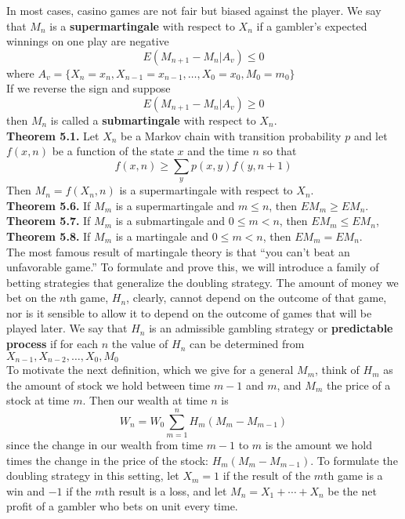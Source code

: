 \documentclass[12pt]{article}
\begin{document}
In most cases, casino games are not fair but biased against the player. We say that $M_n$ is a \textbf{supermartingale} with respect to $X_n$ if a gambler's expected winnings on one play are negative $$E(M_{n+1} - M_n | A_v) \leq 0$$ where $A_v = \{ X_n = x_n, X_{n-1} = x_{n-1}, \ldots, X_0 = x_0, M_0 = m_0\}$\\

If we reverse the sign and suppose $$E(M_{n+1} - M_n | A_v) \geq 0$$ then $M_n$ is called a \textbf{submartingale} with respect to $X_n$.\\

\textbf{Theorem 5.1.} Let $X_n$ be a Markov chain with transition probability $p$ and let $f(x,n)$ be a function of the state $x$ and the time $n$ so that $$f(x,n) \geq \sum_y p(x,y)f(y, n+1)$$ Then $M_n = f(X_n, n)$ is a supermartingale with respect to $X_n$.\\

\textbf{Theorem 5.6.} If $M_m$ is a supermartingale and $m \leq n$, then $EM_m \geq EM_n$.\\

\textbf{Theorem 5.7.} If $M_m$ is a submartingale and $0 \leq m <n$, then $EM_m \leq EM_n$,\\

\textbf{Theorem 5.8.} If $M_m$ is a martingale and $0 \leq m < n$, then $EM_m = EM_n$.\\

The most famous result of martingale theory is that ``you can't beat an unfavorable game.'' To formulate and prove this, we will introduce a family of betting strategies that generalize the doubling strategy. The amount of money we bet on the $n$th game, $H_n$, clearly, cannot depend on the outcome of that game, nor is it sensible to allow it to depend on the outcome of games that will be played later. We say that $H_n$ is an admissible gambling strategy or \textbf{predictable process} if for each $n$ the value of $H_n$ can be determined from $X_{n-1}, X_{n-2}, \ldots, X_0, M_0$\\

To motivate the next definition, which we give for a general $M_m$, think of $H_m$ as the amount of stock we hold between time $m-1$ and $m$, and $M_m$ the price of a stock at time $m$. Then our wealth at time $n$ is $$W_n = W_0 \sum_{m=1}^n H_m(M_m - M_{m-1})$$ since the change in our wealth from time $m-1$ to $m$ is the amount we hold times the change in the price of the stock: $H_m(M_m - M_{m-1})$. To formulate the doubling strategy in this setting, let $X_m = 1$ if the result of the $m$th game is a win and $-1$ if the $m$th result is a loss, and let $M_n = X_1 + \cdots + X_n$ be the net profit of a gambler who bets on unit every time.\\
\end{document}
